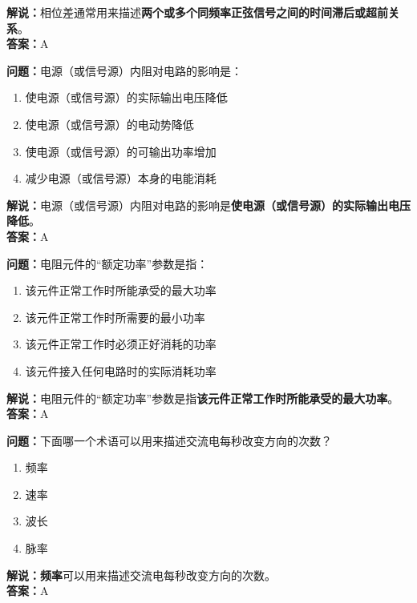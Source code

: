\textbf{解说：}相位差通常用来描述\textbf{两个或多个同频率正弦信号之间的时间滞后或超前关系}。\\\textbf{答案：}A



\textbf{问题：}电源（或信号源）内阻对电路的影响是：

\begin{enumerate}[label=\Alph*), leftmargin=1cm]
	\item 使电源（或信号源）的实际输出电压降低
	\item 使电源（或信号源）的电动势降低
	\item 使电源（或信号源）的可输出功率增加
	\item 减少电源（或信号源）本身的电能消耗
\end{enumerate}

\textbf{解说：}电源（或信号源）内阻对电路的影响是\textbf{使电源（或信号源）的实际输出电压降低}。\\\textbf{答案：}A



\textbf{问题：}电阻元件的“额定功率”参数是指：

\begin{enumerate}[label=\Alph*), leftmargin=1cm]
	\item 该元件正常工作时所能承受的最大功率
	\item 该元件正常工作时所需要的最小功率
	\item 该元件正常工作时必须正好消耗的功率
	\item 该元件接入任何电路时的实际消耗功率
\end{enumerate}

\textbf{解说：}电阻元件的“额定功率”参数是指\textbf{该元件正常工作时所能承受的最大功率}。\\\textbf{答案：}A



\textbf{问题：}下面哪一个术语可以用来描述交流电每秒改变方向的次数？

\begin{enumerate}[label=\Alph*), leftmargin=1cm]
	\item 频率
	\item 速率
	\item 波长
	\item 脉率
\end{enumerate}

\textbf{解说：}\textbf{频率}可以用来描述交流电每秒改变方向的次数。\\\textbf{答案：}A




